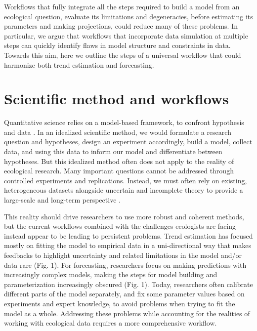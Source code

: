 \documentclass[11pt]{article}
\begin{document}
Workflows that fully integrate all the steps required to build a model from an ecological question, evaluate its limitations and degeneracies, before estimating its parameters and making projections, could reduce many of these problems. In particular, we argue that workflows that incorporate data simulation at multiple steps can quickly identify flaws in model structure and constraints in data. Towards this aim, here we outline the steps of a universal workflow that could harmonize both trend estimation and forecasting.

\section{Scientific method and workflows}

Quantitative science relies on a model-based framework, to confront hypothesis and data \citep{}. In an idealized scientific method, we would formulate a research question and hypotheses, design an experiment accordingly, build a model, collect data, and using this data to inform our model and differentiate between hypotheses. But this idealized method often does not apply to the reality of ecological research. Many important questions cannot be addressed through controlled experiments and replications. Instead, we must often rely on existing, heterogeneous datasets alongside uncertain and incomplete theory to provide a large-scale and long-term perspective \citep{Hilborn1997}.

This reality should drive researchers to use more robust and coherent methods, but the current workflows combined with the challenges ecologists are facing instead appear to be leading to persistent problems. 
Trend estimation has focused mostly on fitting the model to empirical data in a uni-directional way that makes feedbacks to highlight uncertainty and related limitations in the model and/or data rare (Fig. 1). For forecasting, researchers focus on making predictions with increasingly complex models, making the steps for model building and parameterization increasingly obscured (Fig. 1). Today, researchers often calibrate different parts of the model separately, and fix some parameter values based on experiments and expert knowledge, to avoid problems when trying to fit the model as a whole. Addressing these problems while accounting for the realities of working with ecological data requires a more comprehensive workflow. 
\end{document}
